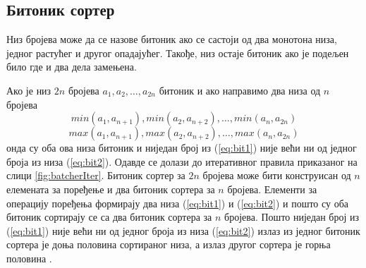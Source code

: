\documentclass[12pt, a4paper]{article}
\theoremstyle{definition}
\begin{document}
\subsection{Битоник сортер}
Низ бројева може да се назове битоник ако се састоји од два монотона низа, једног растућег и другог опадајућег. Такође, низ остаје битоник ако је подељен било где и два дела замењена.

Ако је низ $2n$ бројева $a_1, a_2, \dots, a_{2n}$ битоник и ако направимо два низа од $n$ бројева
\begin{equation}
 min(a_1, a_{n+1}), min(a_2, a_{n+2}), \dots, min(a_n, a_{2n})
 \label{eq:bit1}
\end{equation}
\begin{equation}
 max(a_1, a_{n+1}), max(a_2, a_{n+2}), \dots, max(a_n, a_{2n})
 \label{eq:bit2}
\end{equation}
онда су оба ова низа битоник и ниједан број из (\ref{eq:bit1}) није већи ни од једног броја из низа (\ref{eq:bit2}). Одавде се долази до итеративног правила приказаног на слици \ref{fig:batcherIter}. Битоник сортер за $2n$ бројева може бити конструисан од $n$ елемената за поређење и два битоник сортера за $n$ бројева. Елементи за операцију поређења формирају два низа (\ref{eq:bit1}) и (\ref{eq:bit2}) и пошто су оба битоник сортирају се са два битоник сортера за $n$ бројева. Пошто ниједан број из (\ref{eq:bit1}) није већи ни од једног броја из низа (\ref{eq:bit2}) излаз из једног битоник сортера је доња половина сортираног низа, а излаз другог сортера је горња половина \cite{bitonicBatcher}.
\end{document}
